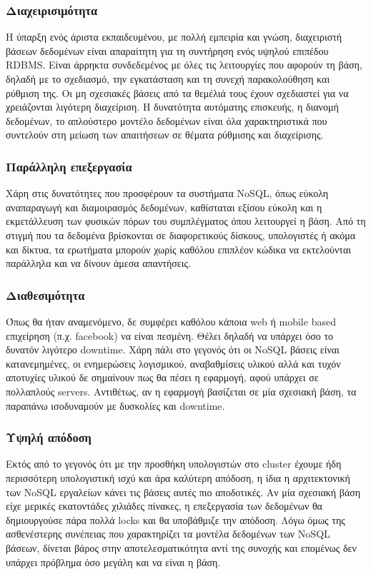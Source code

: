 		\subsubsection{Διαχειρισιμότητα}
		Η ύπαρξη ενός άριστα εκπαιδευμένου, με πολλή εμπειρία και γνώση, διαχειριστή βάσεων δεδομένων είναι απαραίτητη για τη συντήρηση ενός υψηλού επιπέδου RDBMS. Είναι άρρηκτα συνδεδεμένος με όλες τις λειτουργίες που αφορούν τη βάση, δηλαδή με το σχεδιασμό, την εγκατάσταση και τη συνεχή παρακολούθηση και ρύθμιση της. Οι μη σχεσιακές βάσεις από τα θεμέλιά τους έχουν σχεδιαστεί για να χρειάζονται λιγότερη διαχείριση. Η δυνατότητα αυτόματης επισκευής, η διανομή δεδομένων, το απλούστερο μοντέλο δεδομένων είναι όλα χαρακτηριστικά που συντελούν στη μείωση των απαιτήσεων σε θέματα ρύθμισης και διαχείρισης\cite{stonebraker2010sql}.
		
		\subsubsection{Παράλληλη επεξεργασία}
		Χάρη στις δυνατότητες που προσφέρουν τα συστήματα NoSQL, όπως εύκολη αναπαραγωγή και διαμοιρασμός δεδομένων, καθίσταται εξίσου εύκολη και η εκμετάλλευση των φυσικών πόρων του συμπλέγματος όπου λειτουργεί η βάση. Από τη στιγμή που τα δεδομένα βρίσκονται σε διαφορετικούς δίσκους, υπολογιστές ή ακόμα και δίκτυα, τα ερωτήματα μπορούν χωρίς καθόλου επιπλέον κώδικα να εκτελούνται παράλληλα και να δίνουν άμεσα απαντήσεις\cite{stonebraker2010sql}.
		
		\subsubsection{Διαθεσιμότητα}
		Όπως θα ήταν αναμενόμενο, δε συμφέρει καθόλου κάποια web ή mobile based επιχείρηση (π.χ. facebook) να είναι πεσμένη. Θέλει δηλαδή να υπάρχει όσο το δυνατόν λιγότερο downtime. Χάρη πάλι στο γεγονός ότι οι NoSQL βάσεις είναι κατανεμημένες, οι ενημερώσεις λογισμικού, αναβαθμίσεις υλικού αλλά και τυχόν αποτυχίες υλικού δε σημαίνουν πως θα πέσει η εφαρμογή, αφού υπάρχει σε πολλαπλούς servers. Αντιθέτως, αν η εφαρμογή βασίζεται σε μία σχεσιακή βάση, τα παραπάνω ισοδυναμούν με δυσκολίες και downtime\cite{stonebraker2010sql}.
		
		\subsubsection{Υψηλή απόδοση}
		Εκτός από το γεγονός ότι με την προσθήκη υπολογιστών στο cluster έχουμε ήδη περισσότερη υπολογιστική ισχύ και άρα καλύτερη απόδοση, η ίδια η αρχιτεκτονική των NoSQL εργαλείων κάνει τις βάσεις αυτές πιο αποδοτικές. Αν μία σχεσιακή βάση είχε μερικές εκατοντάδες χιλιάδες πίνακες, η επεξεργασία των δεδομένων θα δημιουργούσε πάρα πολλά locks και θα υποβάθμιζε την απόδοση. Λόγω όμως της ασθενέστερης συνέπειας που χαρακτηρίζει τα μοντέλα δεδομένων των NoSQL βάσεων, δίνεται βάρος στην αποτελεσματικότητα αντί της συνοχής και επομένως δεν υπάρχει πρόβλημα όσο μεγάλη και να είναι η βάση\cite{stonebraker2010sql}.
		
